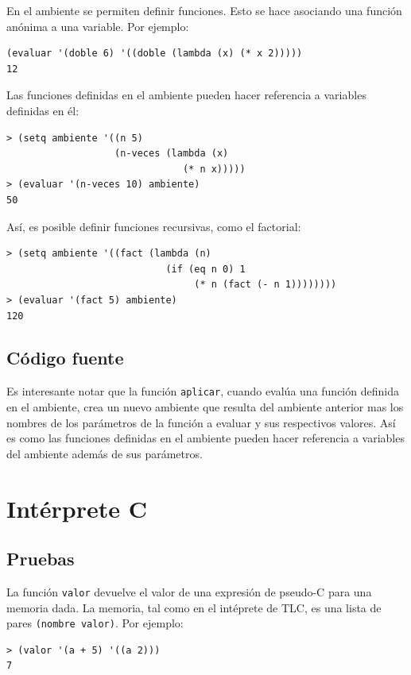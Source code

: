 \documentclass[12pt,titlepage]{article}
\begin{document}
En el ambiente se permiten definir funciones. Esto se hace asociando una función anónima a una variable. Por ejemplo:
\begin{lstlisting}
(evaluar '(doble 6) '((doble (lambda (x) (* x 2)))))
12
\end{lstlisting}

Las funciones definidas en el ambiente pueden hacer referencia a variables definidas en él:
\begin{lstlisting}
> (setq ambiente '((n 5) 
                   (n-veces (lambda (x) 
                               (* n x)))))
> (evaluar '(n-veces 10) ambiente)
50
\end{lstlisting}

Así, es posible definir funciones recursivas, como el factorial:
\begin{lstlisting}
> (setq ambiente '((fact (lambda (n) 
                            (if (eq n 0) 1
                                 (* n (fact (- n 1))))))))
> (evaluar '(fact 5) ambiente)
120
\end{lstlisting}

\subsection{Código fuente}



Es interesante notar que la función \lstinline|aplicar|, cuando evalúa una función definida en el ambiente, crea un nuevo ambiente que resulta del ambiente anterior mas los nombres de los parámetros de la función a evaluar y sus respectivos valores. Así es como las funciones definidas en el ambiente pueden hacer referencia a variables del ambiente además de sus parámetros.

\section{Intérprete C}

\subsection{Pruebas}

La función \lstinline|valor| devuelve el valor de una expresión de pseudo-C para una memoria dada. La memoria, tal como en el intéprete de TLC, es una lista de pares \lstinline|(nombre valor)|. Por ejemplo:
\begin{lstlisting}
> (valor '(a + 5) '((a 2)))
7
\end{lstlisting}
\end{document}
